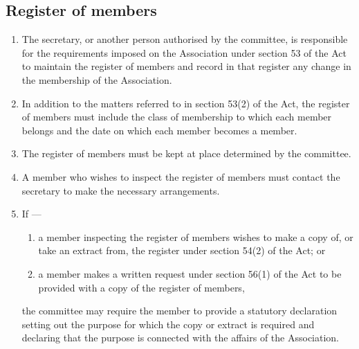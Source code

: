 \documentclass[../constitution.tex]{subfiles}
\begin{document}
\hypertarget{register-of-members}{%
\subsection{Register of members}\label{register-of-members}}

\begin{enumerate}

\item The secretary, or another person authorised by the committee, is responsible for the requirements imposed on the Association under section 53 of the Act to maintain the register of members and record in that register any change in the membership of the Association.
\item In addition to the matters referred to in section 53(2) of the Act, the register of members must include the class of membership  to which each member belongs and the date on which each member becomes a member.
\item The register of members must be kept at  place determined by the committee. 
\item A member who wishes to inspect the register of members must contact the secretary to make the necessary arrangements.
\item If ---

  \begin{enumerate}
  \item a member inspecting the register of members wishes to make a copy of, or take an extract from, the register under section 54(2) of the Act; or
  \item a member makes a written request under section 56(1) of the Act to be provided with a copy of the register of members,

  \end{enumerate}
  the committee may require the member to provide a statutory declaration setting out the purpose for which the copy or extract is required and declaring that the purpose is connected with the affairs of the Association.
\end{enumerate}
\end{document}
